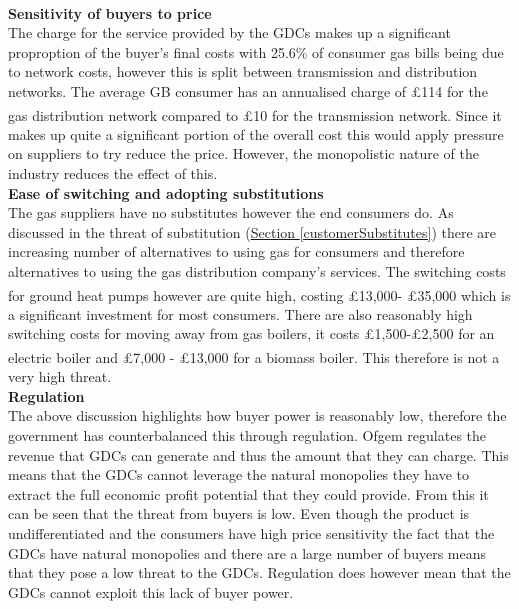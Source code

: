 \documentclass[11pt]{article}		%
\newcommand{\supercite}[1]{\textsuperscript{\cite{#1}}}		%
\newcommand{\sectref}[1]{\hyperref[#1]{Section \ref*{#1}}}     %
\begin{document}
                \\
              \textbf{  Sensitivity of buyers to price}
              \\
                The charge for the service provided by the GDCs makes up a significant proproption of the buyer’s final costs with 25.6\% of consumer gas bills being due to network costs, however this is split between transmission and distribution networks. The average GB consumer has an annualised charge of £114 for the gas distribution network compared to £10 for the transmission network.\supercite{gas_cost} Since it makes up quite a significant portion of the overall cost this would apply pressure on suppliers to try reduce the price. However, the monopolistic nature of the industry reduces the effect of this.
                \\
                \textbf{Ease of switching and adopting substitutions}
                \\
                The gas suppliers have no substitutes however the end consumers do. As discussed in the threat of substitution (\sectref{customerSubstitutes}) there are increasing number of alternatives to using gas for consumers and therefore alternatives to using the gas distribution company’s services. The switching costs for ground heat pumps however are quite high, costing £13,000- £35,000\supercite{Heat_Pump_Cost} which is a significant investment for most consumers. There are also reasonably high switching costs for moving away from gas boilers, it costs £1,500-£2,500 for an electric boiler and £7,000 - £13,000 for a biomass boiler.\supercite{boiler_cost}  This therefore is not a very high threat.
                \\
                \textbf{Regulation}
                \\
                The above discussion highlights how buyer power is reasonably low, therefore the government has counterbalanced this through regulation. Ofgem regulates the revenue that GDCs can generate and thus the amount that they can charge. This means that the GDCs cannot leverage the natural monopolies they have to extract the full economic profit potential that they could provide.
                From this it can be seen that the threat from buyers is low. Even though the product is undifferentiated and the consumers have high price sensitivity the fact that the GDCs have natural monopolies and there are a large number of buyers means that they pose a low threat to the GDCs. Regulation does however mean that the GDCs cannot exploit this lack of buyer power.
                 
\end{document}
